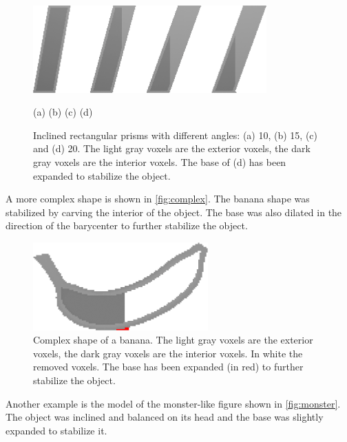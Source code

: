 \documentclass[tikz,10pt,fleqn]{article}
\begin{document}
\begin{figure}[H]
    {
    \centering
    \includegraphics[width=0.8\textwidth]{fig/carved.png}\\
    }
    
    \hspace{1.9cm} (a) \hspace{2.4cm} (b) \hspace{2.4cm} (c) \hspace{2.9cm} (d)

    \caption{Inclined rectangular prisms with different angles: (a) 10\degree, (b) 15\degree, (c) and (d) 20\degree. The light gray voxels are the exterior voxels, the dark gray voxels are the interior voxels. The base of (d) has been expanded to stabilize the object.}
    \label{fig:prisms}
\end{figure}

A more complex shape is shown in \autoref{fig:complex}. The banana shape was stabilized by carving the interior of the object. The base was also dilated in the direction of the barycenter to further stabilize the object.
\begin{figure}[H]
    \centering
    \includegraphics[width=0.6\textwidth]{fig/banana_carved.png}
    \caption{Complex shape of a banana. The light gray voxels are the exterior voxels, the dark gray voxels are the interior voxels. In white the removed voxels. The base has been expanded (in red) to further stabilize the object.}
    \label{fig:complex}
\end{figure}

Another example is the model of the monster-like figure shown in \autoref{fig:monster}. The object was inclined and balanced on its head and the base was slightly expanded to stabilize it.
\end{document}
